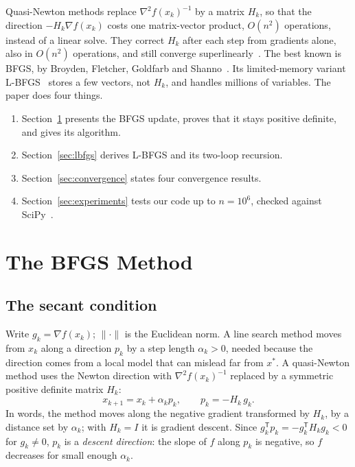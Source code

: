 \documentclass[11pt,a4paper]{amsart}
\numberwithin{equation}{section}
\theoremstyle{plain}
\theoremstyle{definition}
\theoremstyle{remark}
\newcommand{\grad}{\nabla}
\newcommand{\T}{\mathsf{T}}
\newcommand{\norm}[1]{\lVert #1 \rVert}
\begin{document}
Quasi-Newton methods replace $\grad^2 f(x_k)^{-1}$ by a matrix $H_k$, so
that the direction $-H_k \grad f(x_k)$ costs one matrix-vector product,
$O(n^2)$ operations, instead of a linear solve. They correct $H_k$ after
each step from gradients alone, also in $O(n^2)$ operations, and still
converge superlinearly~\cite{dennis1977,nocedal2006,miladinovic2015}.
The best known is BFGS, by Broyden, Fletcher, Goldfarb and
Shanno~\cite{broyden1970,fletcher1970,goldfarb1970,shanno1970}. Its
limited-memory variant L-BFGS~\cite{nocedal1980,liu1989} stores a few
vectors, not $H_k$, and handles millions of variables. The paper does
four things.
\begin{enumerate}[leftmargin=*, nosep]
\item Section~\ref{sec:bfgs} presents the BFGS update, proves that it
  stays positive definite, and gives its algorithm.
\item Section~\ref{sec:lbfgs} derives L-BFGS and its two-loop recursion.
\item Section~\ref{sec:convergence} states four convergence results.
\item Section~\ref{sec:experiments} tests our code up to $n = 10^6$,
  checked against SciPy~\cite{scipy2020,byrd1995}.
\end{enumerate}

\section{The BFGS Method}\label{sec:bfgs}

\subsection{The secant condition}\label{sec:secant}

Write $g_k = \grad f(x_k)$; $\norm{\cdot}$ is the Euclidean norm. A line
search method moves from $x_k$ along a direction $p_k$ by a step length
$\alpha_k > 0$, needed because the direction comes from a local model
that can mislead far from $x^*$. A quasi-Newton method uses the Newton
direction with $\grad^2 f(x_k)^{-1}$ replaced by a symmetric positive
definite matrix $H_k$:
\begin{equation}\label{eq:iteration}
  x_{k+1} = x_k + \alpha_k p_k, \qquad p_k = -H_k\, g_k .
\end{equation}
In words, the method moves along the negative gradient transformed by
$H_k$, by a distance set by $\alpha_k$; with $H_k = I$ it is gradient
descent. Since $g_k^\T p_k = -g_k^\T H_k g_k < 0$ for $g_k \neq 0$,
$p_k$ is a \emph{descent direction}: the slope of $f$ along $p_k$ is
negative, so $f$ decreases for small enough $\alpha_k$.
\end{document}

